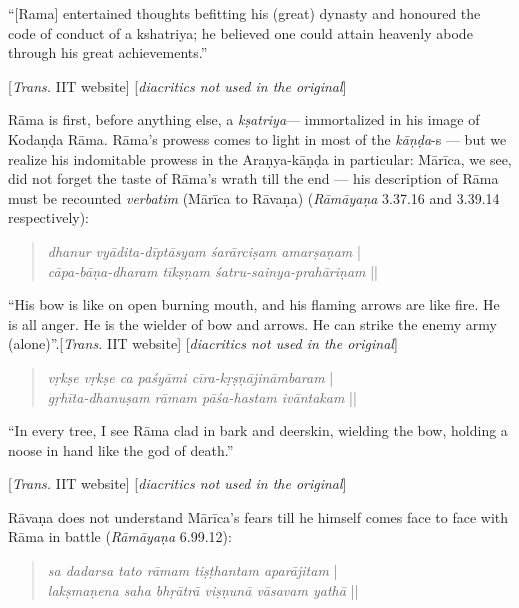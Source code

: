 \begin{myquote}
“[Rama] entertained thoughts befitting his (great) dynasty and honoured the code of conduct of a kshatriya; he believed one could attain heavenly abode through his great achievements.”

\hfill [{\sl Trans.} IIT website] [{\sl diacritics not used in the original}]
\end{myquote}

Rāma is first, before anything else, a {\sl kṣatriya}--- immortalized in his image of Kodaṇḍa Rāma. Rāma’s prowess comes to light in most of the {\sl kāṇḍa}-s --- but we realize his indomitable prowess in the Araṇya-kāṇḍa in particular: Mārīca, we see, did not forget the taste of Rāma’s wrath till the end --- his description of Rāma must be recounted {\sl verbatim} (Mārīca to Rāvaṇa) ({\sl Rāmāyaṇa} 3.37.16 and 3.39.14 respectively): 
\begin{quote}
{{\sl dhanur vyādita-dīptāsyam śarārciṣam amarṣaṇam}} |\\
{\sl cāpa-bāṇa-dharam tīkṣṇam śatru-sainya-prahāriṇam} ||
\end{quote}

\begin{myquote}
“His bow is like on open burning mouth, and his flaming arrows are like fire. He is all anger. He is the wielder of bow and arrows. He can strike the enemy army (alone)”.\hfill [{\sl Trans.} IIT website] [{\sl diacritics not used in the original}] 
\end{myquote}

\begin{quote}
{{\sl vṛkṣe vṛkṣe ca paśyāmi cīra-kṛṣṇājināmbaram}} |\\
{\sl gṛhīta-dhanuṣam rāmam pāśa-hastam ivāntakam} || 
\end{quote}

\begin{myquote}
“In every tree, I see Rāma clad in bark and deerskin, wielding the bow, holding a noose in hand like the god of death.” 

\hfill [{\sl Trans.} IIT website] [{\sl diacritics not used in the original}]
\end{myquote}

Rāvaṇa does not understand Mārīca’s fears till he himself comes face to face with Rāma in battle ({\sl Rāmāyaṇa} 6.99.12): 

\begin{quote}
{{\sl sa dadarsa tato rāmam tiṣṭhantam aparājitam}} |\\
{\sl lakṣmaṇena saha bhṛātrā viṣṇunā vāsavam yathā} || 
\end{quote}

